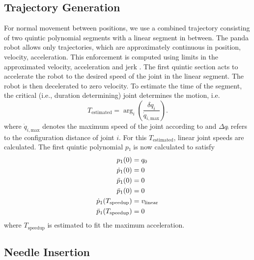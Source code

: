 \subsection{Trajectory Generation}
For normal movement between positions, we use a combined trajectory consisting of two quintic polynomial segments with a linear segment in between. The panda robot allows only trajectories, which are approximately continuous in position, velocity, acceleration. This enforcement is computed using limits in the approximated velocity, acceleration and jerk \cite{panda-spec}.
The first quintic section acts to accelerate the robot to the desired speed of the joint in the linear segment. The robot is then decelerated to zero velocity.
To estimate the time of the segment, the critical (i.e., duration determining) joint determines the motion, i.e.
$$
    T_{\text{estimated}} = \operatorname{arg}_i(\frac{\delta q_i}{\dot{q}_{i, \text{max}}}).
$$ where $\dot{q}_{i, \text{max}}$ denotes the maximum speed of the joint according to \cite{panda-spec} and $Δqᵢ$ refers to the configuration distance of joint $i$.
For this $T_{\text{estimated}}$, linear joint speeds are calculated. The first quintic polynomial $p₁$ is now calculated to satisfy
\begin{align*}
    p_1(0) &= q_0 \\
    \dot{p}_1(0) &= 0 \\
    \ddot{p}_1(0) &= 0 \\
    \Ddot{p}_1(0) &= 0 \\
    \dot{p}_1(T_{\text{speedup}}) &= v_{\text{linear}} \\
    \ddot{p}_1(T_{\text{speedup}}) &= 0
\end{align*}
where $T_{\text{speedup}}$ is estimated to fit the maximum acceleration.

\subsection{Needle Insertion}